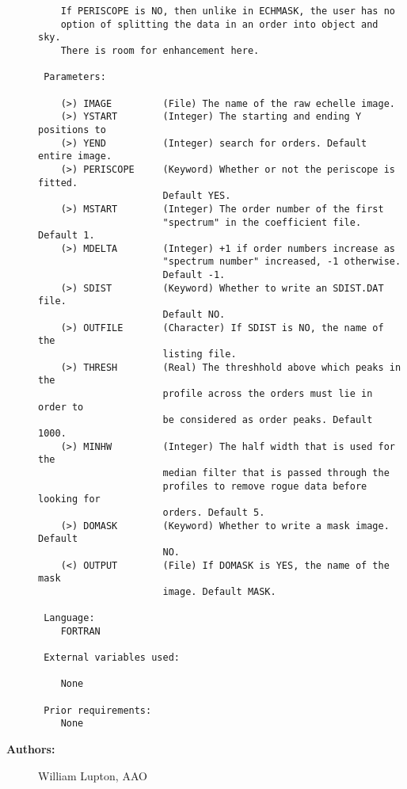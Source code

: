 \begin{description}
\begin{verbatim}
    If PERISCOPE is NO, then unlike in ECHMASK, the user has no
    option of splitting the data in an order into object and sky.
    There is room for enhancement here.

 Parameters:

    (>) IMAGE         (File) The name of the raw echelle image.
    (>) YSTART        (Integer) The starting and ending Y positions to
    (>) YEND          (Integer) search for orders. Default entire image.
    (>) PERISCOPE     (Keyword) Whether or not the periscope is fitted.
                      Default YES.
    (>) MSTART        (Integer) The order number of the first
                      "spectrum" in the coefficient file. Default 1.
    (>) MDELTA        (Integer) +1 if order numbers increase as
                      "spectrum number" increased, -1 otherwise.
                      Default -1.
    (>) SDIST         (Keyword) Whether to write an SDIST.DAT file.
                      Default NO.
    (>) OUTFILE       (Character) If SDIST is NO, the name of the
                      listing file.
    (>) THRESH        (Real) The threshhold above which peaks in the
                      profile across the orders must lie in order to
                      be considered as order peaks. Default 1000.
    (>) MINHW         (Integer) The half width that is used for the
                      median filter that is passed through the
                      profiles to remove rogue data before looking for
                      orders. Default 5.
    (>) DOMASK        (Keyword) Whether to write a mask image. Default
                      NO.
    (<) OUTPUT        (File) If DOMASK is YES, the name of the mask
                      image. Default MASK.

 Language:
    FORTRAN

 External variables used:

    None

 Prior requirements:
    None

\end{verbatim}

\item [{\bf Authors:}]
 William Lupton, AAO
\end{description}
